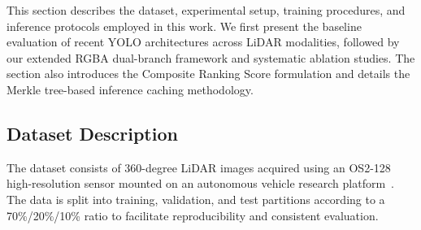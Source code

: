\documentclass[runningheads]{llncs}
\begin{document}
This section describes the dataset, experimental setup, training procedures, and inference protocols employed in this work. We first present the baseline evaluation of recent YOLO architectures across LiDAR modalities, followed by our extended RGBA dual-branch framework and systematic ablation studies. The section also introduces the Composite Ranking Score formulation and details the Merkle tree-based inference caching methodology.

\subsection{Dataset Description}

The dataset consists of 360-degree LiDAR images acquired using an OS2-128 high-resolution sensor mounted on an autonomous vehicle research platform~\cite{bavirisetti2025snowpole}. The data is split into training, validation, and test partitions according to a 70\%/20\%/10\% ratio to facilitate reproducibility and consistent evaluation. 
\end{document}
